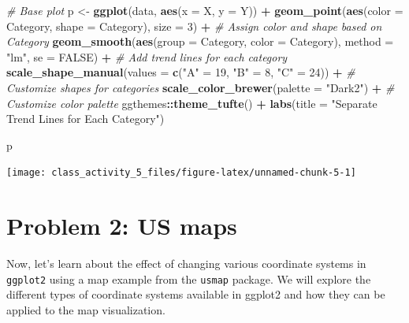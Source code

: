 \documentclass[
]{book}
\newenvironment{Shaded}{\begin{snugshade}}{\end{snugshade}}
\newcommand{\AttributeTok}[1]{\textcolor[rgb]{0.13,0.29,0.53}{#1}}
\newcommand{\CommentTok}[1]{\textcolor[rgb]{0.56,0.35,0.01}{\textit{#1}}}
\newcommand{\ConstantTok}[1]{\textcolor[rgb]{0.56,0.35,0.01}{#1}}
\newcommand{\DecValTok}[1]{\textcolor[rgb]{0.00,0.00,0.81}{#1}}
\newcommand{\FunctionTok}[1]{\textcolor[rgb]{0.13,0.29,0.53}{\textbf{#1}}}
\newcommand{\NormalTok}[1]{#1}
\newcommand{\OtherTok}[1]{\textcolor[rgb]{0.56,0.35,0.01}{#1}}
\newcommand{\SpecialCharTok}[1]{\textcolor[rgb]{0.81,0.36,0.00}{\textbf{#1}}}
\newcommand{\StringTok}[1]{\textcolor[rgb]{0.31,0.60,0.02}{#1}}
\begin{document}
\begin{Shaded}
\begin{Highlighting}[]
\CommentTok{\# Base plot}
\NormalTok{p }\OtherTok{\textless{}{-}} \FunctionTok{ggplot}\NormalTok{(data, }\FunctionTok{aes}\NormalTok{(}\AttributeTok{x =}\NormalTok{ X, }\AttributeTok{y =}\NormalTok{ Y)) }\SpecialCharTok{+}
  \FunctionTok{geom\_point}\NormalTok{(}\FunctionTok{aes}\NormalTok{(}\AttributeTok{color =}\NormalTok{ Category, }\AttributeTok{shape =}\NormalTok{ Category), }\AttributeTok{size =} \DecValTok{3}\NormalTok{) }\SpecialCharTok{+} \CommentTok{\# Assign color and shape based on Category}
  \FunctionTok{geom\_smooth}\NormalTok{(}\FunctionTok{aes}\NormalTok{(}\AttributeTok{group =}\NormalTok{ Category, }\AttributeTok{color =}\NormalTok{ Category), }\AttributeTok{method =} \StringTok{"lm"}\NormalTok{, }\AttributeTok{se =} \ConstantTok{FALSE}\NormalTok{) }\SpecialCharTok{+} \CommentTok{\# Add trend lines for each category}
  \FunctionTok{scale\_shape\_manual}\NormalTok{(}\AttributeTok{values =} \FunctionTok{c}\NormalTok{(}\StringTok{"A"} \OtherTok{=} \DecValTok{19}\NormalTok{, }\StringTok{"B"} \OtherTok{=} \DecValTok{8}\NormalTok{, }\StringTok{"C"} \OtherTok{=} \DecValTok{24}\NormalTok{)) }\SpecialCharTok{+} \CommentTok{\# Customize shapes for categories}
  \FunctionTok{scale\_color\_brewer}\NormalTok{(}\AttributeTok{palette =} \StringTok{"Dark2"}\NormalTok{) }\SpecialCharTok{+} \CommentTok{\# Customize color palette}
\NormalTok{  ggthemes}\SpecialCharTok{::}\FunctionTok{theme\_tufte}\NormalTok{() }\SpecialCharTok{+} 
  \FunctionTok{labs}\NormalTok{(}\AttributeTok{title =} \StringTok{"Separate Trend Lines for Each Category"}\NormalTok{)}

\NormalTok{p}
\end{Highlighting}
\end{Shaded}

\texttt{[image: class\_activity\_5\_files/figure-latex/unnamed-chunk-5-1]}

\hypertarget{problem-2-us-maps}{%
\section{Problem 2: US maps}\label{problem-2-us-maps}}

Now, let's learn about the effect of changing various coordinate systems in \texttt{ggplot2} using a map example from the \texttt{usmap} package. We will explore the different types of coordinate systems available in ggplot2 and how they can be applied to the map visualization.
\end{document}
